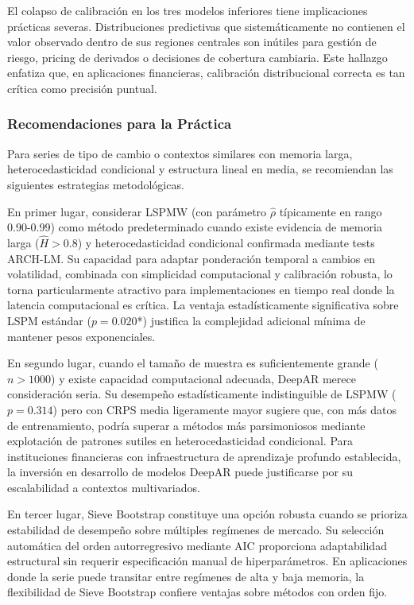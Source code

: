 El colapso de calibración en los tres modelos inferiores tiene implicaciones prácticas severas. Distribuciones predictivas que sistemáticamente no contienen el valor observado dentro de sus regiones centrales son inútiles para gestión de riesgo, pricing de derivados o decisiones de cobertura cambiaria. Este hallazgo enfatiza que, en aplicaciones financieras, calibración distribucional correcta es tan crítica como precisión puntual.

\subsubsection{Recomendaciones para la Práctica}

Para series de tipo de cambio o contextos similares con memoria larga, heterocedasticidad condicional y estructura lineal en media, se recomiendan las siguientes estrategias metodológicas.

En primer lugar, considerar LSPMW (con parámetro $\hat{\rho}$ típicamente en rango 0.90-0.99) como método predeterminado cuando existe evidencia de memoria larga ($\hat{H} > 0.8$) y heterocedasticidad condicional confirmada mediante tests ARCH-LM. Su capacidad para adaptar ponderación temporal a cambios en volatilidad, combinada con simplicidad computacional y calibración robusta, lo torna particularmente atractivo para implementaciones en tiempo real donde la latencia computacional es crítica. La ventaja estadísticamente significativa sobre LSPM estándar ($p = 0.020$*) justifica la complejidad adicional mínima de mantener pesos exponenciales.

En segundo lugar, cuando el tamaño de muestra es suficientemente grande ($n > 1000$) y existe capacidad computacional adecuada, DeepAR merece consideración seria. Su desempeño estadísticamente indistinguible de LSPMW ($p = 0.314$) pero con CRPS media ligeramente mayor sugiere que, con más datos de entrenamiento, podría superar a métodos más parsimoniosos mediante explotación de patrones sutiles en heterocedasticidad condicional. Para instituciones financieras con infraestructura de aprendizaje profundo establecida, la inversión en desarrollo de modelos DeepAR puede justificarse por su escalabilidad a contextos multivariados.

En tercer lugar, Sieve Bootstrap constituye una opción robusta cuando se prioriza estabilidad de desempeño sobre múltiples regímenes de mercado. Su selección automática del orden autorregresivo mediante AIC proporciona adaptabilidad estructural sin requerir especificación manual de hiperparámetros. En aplicaciones donde la serie puede transitar entre regímenes de alta y baja memoria, la flexibilidad de Sieve Bootstrap confiere ventajas sobre métodos con orden fijo.

